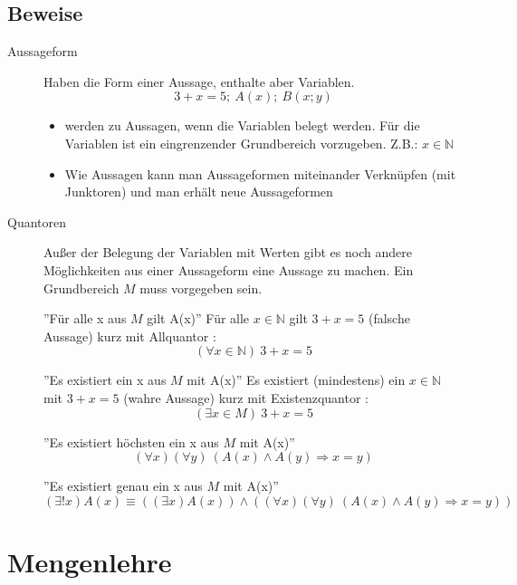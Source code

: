 \documentclass[12pt,a4paper]{article}
\begin{document}
\subsection{Beweise}
	\begin{description}
		\item[Aussageform] Haben die Form einer Aussage, enthalte aber Variablen.
		$$3 + x = 5;\ A(x);\ B(x;y)$$
		\begin{itemize}
			\item werden zu Aussagen, wenn die Variablen belegt werden. Für die Variablen ist ein eingrenzender Grundbereich vorzugeben. Z.B.: $x \in \mathbb{N}$
			\item Wie Aussagen kann man Aussageformen miteinander Verknüpfen (mit Junktoren) und man erhält neue Aussageformen
		\end{itemize}
		
		\item[Quantoren] Außer der Belegung der Variablen mit Werten gibt es noch andere Möglichkeiten aus einer Aussageform eine Aussage zu machen. Ein Grundbereich $M$ muss vorgegeben sein.
		
		''Für alle x aus $M$ gilt A(x)'' \newline
		Für alle $x \in \mathbb{N}$ gilt $3 + x = 5$ (falsche Aussage) kurz mit Allquantor \forall :
		$$(\forall x \in \mathbb{N})\ 3 + x = 5$$
		
		''Es existiert ein x aus $M$ mit A(x)'' \newline 
		Es existiert (mindestens) ein $x \in \mathbb{N}$ mit $3 + x = 5$ (wahre Aussage) kurz mit Existenzquantor \exists :
		$$(\exists x \in M)\ 3 + x = 5$$
		
		''Es existiert höchsten ein x aus $M$ mit A(x)''
		$$(\forall x)(\forall y)\ (A(x) \wedge A(y) \Rightarrow x = y)$$
		
		''Es existiert genau ein x aus $M$ mit A(x)''
		$$(\exists ! x) A(x) \equiv ((\exists x) A(x)) \wedge ((\forall x)(\forall y)\ (A(x) \wedge A(y) \Rightarrow x = y))$$
	\end{description}

\section{Mengenlehre}
\end{document}
